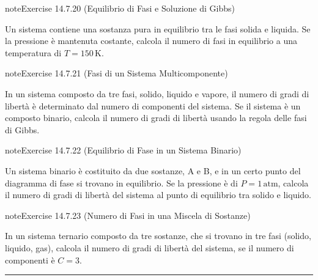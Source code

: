 \documentclass[letterpaper,10pt,italian]{jupyterBook}
\begin{document}
\begin{sphinxadmonition}{note}{Exercise 14.7.20 (Equilibrio di Fasi e Soluzione di Gibbs)}



\sphinxAtStartPar
Un sistema contiene una sostanza pura in equilibrio tra le fasi solida e liquida. Se la pressione è mantenuta costante, calcola il numero di fasi in equilibrio a una temperatura di \(T = 150 \, \text{K}\).
\end{sphinxadmonition}
 \label{exercise:ch/thermodynamics/principles-problems-exercise-20}

\begin{sphinxadmonition}{note}{Exercise 14.7.21 (Fasi di un Sistema Multicomponente)}



\sphinxAtStartPar
In un sistema composto da tre fasi, solido, liquido e vapore, il numero di gradi di libertà è determinato dal numero di componenti del sistema. Se il sistema è un composto binario, calcola il numero di gradi di libertà usando la regola delle fasi di Gibbs.
\end{sphinxadmonition}
 \label{exercise:ch/thermodynamics/principles-problems-exercise-21}

\begin{sphinxadmonition}{note}{Exercise 14.7.22 (Equilibrio di Fase in un Sistema Binario)}



\sphinxAtStartPar
Un sistema binario è costituito da due sostanze, A e B, e in un certo punto del diagramma di fase si trovano in equilibrio. Se la pressione è di \(P = 1 \, \text{atm}\), calcola il numero di gradi di libertà del sistema al punto di equilibrio tra solido e liquido.
\end{sphinxadmonition}
 \label{exercise:ch/thermodynamics/principles-problems-exercise-22}

\begin{sphinxadmonition}{note}{Exercise 14.7.23 (Numero di Fasi in una Miscela di Sostanze)}



\sphinxAtStartPar
In un sistema ternario composto da tre sostanze, che si trovano in tre fasi (solido, liquido, gas), calcola il numero di gradi di libertà del sistema, se il numero di componenti è \(C = 3\).
\end{sphinxadmonition}


\bigskip\hrule\bigskip
\end{document}

